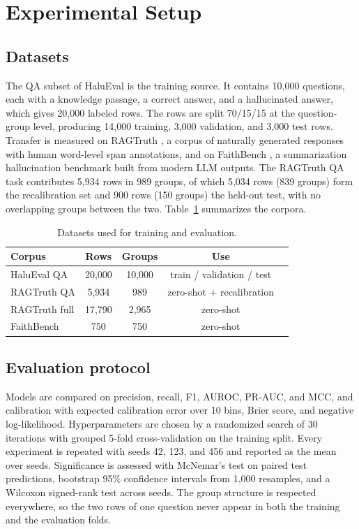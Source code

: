 \section{Experimental Setup}

\subsection{Datasets}

The QA subset of HaluEval \cite{haluEval} is the training source. It contains 10{,}000 questions, each with a knowledge passage, a correct answer, and a hallucinated answer, which gives 20{,}000 labeled rows. The rows are split 70/15/15 at the question-group level, producing 14{,}000 training, 3{,}000 validation, and 3{,}000 test rows. Transfer is measured on RAGTruth \cite{ragtruth}, a corpus of naturally generated responses with human word-level span annotations, and on FaithBench \cite{faithbench}, a summarization hallucination benchmark built from modern LLM outputs. The RAGTruth QA task contributes 5{,}934 rows in 989 groups, of which 5{,}034 rows (839 groups) form the recalibration set and 900 rows (150 groups) the held-out test, with no overlapping groups between the two. Table~\ref{tab:datasets} summarizes the corpora.

\begin{table}[t]
\centering
\small
\caption{Datasets used for training and evaluation.}
\label{tab:datasets}
\begin{tabular}{@{}lcccl@{}}
\toprule
\textbf{Corpus} & \textbf{Rows} & \textbf{Groups} & \textbf{Use} \\
\midrule
HaluEval QA      & 20{,}000 & 10{,}000 & train / validation / test \\
RAGTruth QA      & 5{,}934   & 989      & zero-shot + recalibration \\
RAGTruth full    & 17{,}790  & 2{,}965   & zero-shot \\
FaithBench       & 750       & 750      & zero-shot \\
\bottomrule
\end{tabular}
\end{table}

\subsection{Evaluation protocol}

Models are compared on precision, recall, F1, AUROC, PR-AUC, and MCC, and calibration with expected calibration error over 10 bins, Brier score, and negative log-likelihood. Hyperparameters are chosen by a randomized search of 30 iterations with grouped 5-fold cross-validation on the training split. Every experiment is repeated with seeds 42, 123, and 456 and reported as the mean over seeds. Significance is assessed with McNemar's test on paired test predictions, bootstrap 95\% confidence intervals from 1{,}000 resamples, and a Wilcoxon signed-rank test across seeds. The group structure is respected everywhere, so the two rows of one question never appear in both the training and the evaluation folds.

